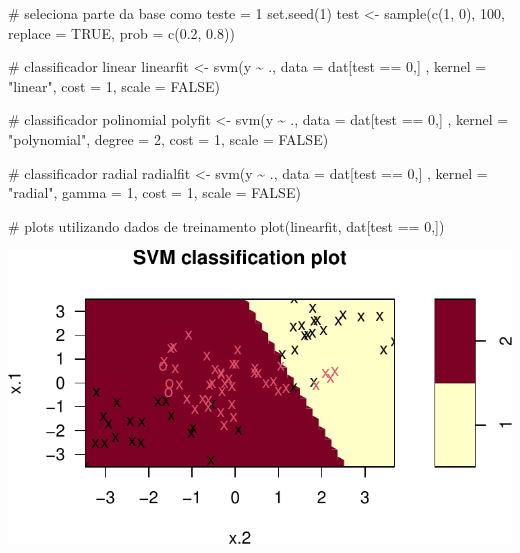 \documentclass[
  a4paperpaper,
]{article}
\newenvironment{Shaded}{\begin{snugshade}}{\end{snugshade}}
\newcommand{\AttributeTok}[1]{\textcolor[rgb]{0.40,0.45,0.13}{#1}}
\newcommand{\CommentTok}[1]{\textcolor[rgb]{0.37,0.37,0.37}{#1}}
\newcommand{\ConstantTok}[1]{\textcolor[rgb]{0.56,0.35,0.01}{#1}}
\newcommand{\DecValTok}[1]{\textcolor[rgb]{0.68,0.00,0.00}{#1}}
\newcommand{\FloatTok}[1]{\textcolor[rgb]{0.68,0.00,0.00}{#1}}
\newcommand{\FunctionTok}[1]{\textcolor[rgb]{0.28,0.35,0.67}{#1}}
\newcommand{\NormalTok}[1]{\textcolor[rgb]{0.00,0.23,0.31}{#1}}
\newcommand{\OtherTok}[1]{\textcolor[rgb]{0.00,0.23,0.31}{#1}}
\newcommand{\SpecialCharTok}[1]{\textcolor[rgb]{0.37,0.37,0.37}{#1}}
\newcommand{\StringTok}[1]{\textcolor[rgb]{0.13,0.47,0.30}{#1}}
\begin{document}
\begin{Shaded}
\begin{Highlighting}[]
\CommentTok{\# seleciona parte da base como teste = 1}
\FunctionTok{set.seed}\NormalTok{(}\DecValTok{1}\NormalTok{)}
\NormalTok{test }\OtherTok{\textless{}{-}} \FunctionTok{sample}\NormalTok{(}\FunctionTok{c}\NormalTok{(}\DecValTok{1}\NormalTok{, }\DecValTok{0}\NormalTok{), }\DecValTok{100}\NormalTok{, }\AttributeTok{replace =} \ConstantTok{TRUE}\NormalTok{, }\AttributeTok{prob =} \FunctionTok{c}\NormalTok{(}\FloatTok{0.2}\NormalTok{, }\FloatTok{0.8}\NormalTok{))}

\CommentTok{\# classificador linear}
\NormalTok{linearfit }\OtherTok{\textless{}{-}} \FunctionTok{svm}\NormalTok{(y }\SpecialCharTok{\textasciitilde{}}\NormalTok{ ., }\AttributeTok{data =}\NormalTok{ dat[test }\SpecialCharTok{==} \DecValTok{0}\NormalTok{,] , }\AttributeTok{kernel =} \StringTok{"linear"}\NormalTok{,}
              \AttributeTok{cost =} \DecValTok{1}\NormalTok{, }\AttributeTok{scale =} \ConstantTok{FALSE}\NormalTok{)}

\CommentTok{\# classificador polinomial}
\NormalTok{polyfit }\OtherTok{\textless{}{-}} \FunctionTok{svm}\NormalTok{(y }\SpecialCharTok{\textasciitilde{}}\NormalTok{ ., }\AttributeTok{data =}\NormalTok{ dat[test }\SpecialCharTok{==} \DecValTok{0}\NormalTok{,] , }\AttributeTok{kernel =} \StringTok{"polynomial"}\NormalTok{,}
              \AttributeTok{degree =} \DecValTok{2}\NormalTok{, }\AttributeTok{cost =} \DecValTok{1}\NormalTok{, }\AttributeTok{scale =} \ConstantTok{FALSE}\NormalTok{)}

\CommentTok{\# classificador radial}
\NormalTok{radialfit }\OtherTok{\textless{}{-}} \FunctionTok{svm}\NormalTok{(y }\SpecialCharTok{\textasciitilde{}}\NormalTok{ ., }\AttributeTok{data =}\NormalTok{ dat[test }\SpecialCharTok{==} \DecValTok{0}\NormalTok{,] , }\AttributeTok{kernel =} \StringTok{"radial"}\NormalTok{,}
              \AttributeTok{gamma =} \DecValTok{1}\NormalTok{, }\AttributeTok{cost =} \DecValTok{1}\NormalTok{, }\AttributeTok{scale =} \ConstantTok{FALSE}\NormalTok{)}

\CommentTok{\# plots utilizando dados de treinamento}
\FunctionTok{plot}\NormalTok{(linearfit, dat[test }\SpecialCharTok{==} \DecValTok{0}\NormalTok{,])}
\end{Highlighting}
\end{Shaded}

\includegraphics{lista-5_files/figure-pdf/svmfit-1.pdf}
\end{document}
